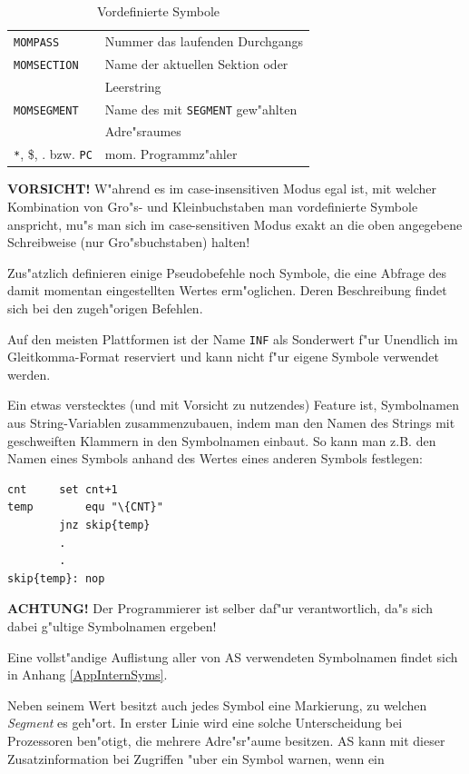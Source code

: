 \documentclass[12pt,a4paper,twoside]{report}
\newcommand{\bb}[1]{{\bf #1}}
\newcommand{\tty}[1]{{\tt #1}}
\newcommand{\asname}{AS}
\begin{document}
\begin{table}[p]
\begin{center}
\begin{tabular}{|l|l|}
\tty{MOMPASS}          & Nummer das laufenden Durchgangs \\
\tty{MOMSECTION}       & Name der aktuellen Sektion oder \\
                       & Leerstring \\
\tty{MOMSEGMENT}       & Name des mit \tty{SEGMENT} gew"ahlten \\
                       & Adre"sraumes \\
\verb!*!, \$, . bzw. \tty{PC} & mom. Programmz"ahler \\
\hline
\end{tabular}\end{center}
\caption{Vordefinierte Symbole\label{TabPredefined}}
\end{table}
\bb{VORSICHT!}  W"ahrend es im case-insensitiven Modus egal ist,
mit welcher Kombination von Gro"s- und Kleinbuchstaben man
vordefinierte Symbole anspricht, mu"s man sich im case-sensitiven
Modus exakt an die oben angegebene Schreibweise (nur Gro"sbuchstaben)
halten!
\par
Zus"atzlich definieren einige Pseudobefehle noch Symbole, die eine
Abfrage des damit momentan eingestellten Wertes erm"oglichen.  Deren
Beschreibung findet sich bei den zugeh"origen Befehlen.
\par
Auf den meisten Plattformen ist der Name {\tt INF} als Sonderwert
f"ur Unendlich im Gleitkomma-Format reserviert und kann nicht
f"ur eigene Symbole verwendet werden.
\par
Ein etwas verstecktes (und mit Vorsicht zu nutzendes) Feature ist,
Symbolnamen aus String-Variablen zusammenzubauen, indem man den
Namen des Strings mit geschweiften Klammern in den Symbolnamen
einbaut.  So kann man z.B. den Namen eines Symbols anhand des
Wertes eines anderen Symbols festlegen:
\begin{verbatim}
cnt		set	cnt+1
temp		equ	"\{CNT}"
		jnz	skip{temp}
		.
		.
skip{temp}:	nop
\end{verbatim}
\bb{ACHTUNG!}  Der Programmierer ist selber daf"ur verantwortlich,
da"s sich dabei g"ultige Symbolnamen ergeben!
\par
Eine vollst"andige Auflistung aller von \asname{} verwendeten Symbolnamen
findet sich in Anhang \ref{AppInternSyms}.
\par
Neben seinem Wert besitzt auch jedes Symbol eine Markierung, zu welchen
{\em Segment} es geh"ort.  In erster Linie wird eine solche Unterscheidung
bei Prozessoren ben"otigt, die mehrere Adre"sr"aume besitzen.  \asname{} kann mit
dieser Zusatzinformation bei Zugriffen "uber ein Symbol warnen, wenn ein
\end{document}
